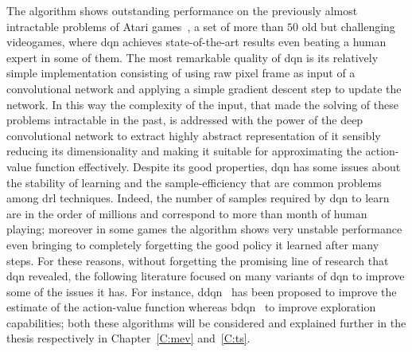 The algorithm shows outstanding performance on the previously almost intractable problems of Atari games~\cite{bellemare2013arcade}, a set of more than $50$ old but challenging videogames, where \gls{dqn} achieves state-of-the-art results even beating a human expert in some of them. The most remarkable quality of \gls{dqn} is its relatively simple implementation consisting of using raw pixel frame as input of a convolutional network and applying a simple gradient descent step to update the network. In this way the complexity of the input, that made the solving of these problems intractable in the past, is addressed with the power of the deep convolutional network to extract highly abstract representation of it sensibly reducing its dimensionality and making it suitable for approximating the action-value function effectively. Despite its good properties, \gls{dqn} has some issues about the stability of learning and the sample-efficiency that are common problems among \gls{drl} techniques. Indeed, the number of samples required by \gls{dqn} to learn are in the order of millions and correspond to more than month of human playing; moreover in some games the algorithm shows very unstable performance even bringing to completely forgetting the good policy it learned after many steps. For these reasons, without forgetting the promising line of research that \gls{dqn} revealed, the following literature focused on many variants of \gls{dqn} to improve some of the issues it has. For instance, \gls{ddqn}~\cite{hasselt2015double} has been proposed to improve the estimate of the action-value function whereas \gls{bdqn}~\cite{osband2017deep} to improve exploration capabilities; both these algorithms will be considered and explained further in the thesis respectively in Chapter~\ref{C:mev} and~\ref{C:ts}.

